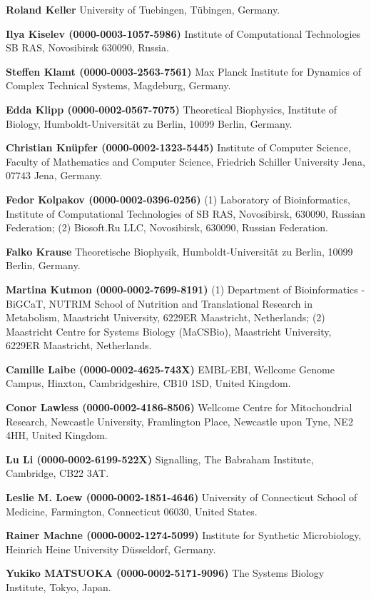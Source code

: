 \documentclass{sbml-paper}
\begin{document}
\textbf{Roland Keller} University of Tuebingen, Tübingen, Germany.

\textbf{Ilya Kiselev (0000-0003-1057-5986)} Institute of Computational Technologies SB RAS, Novosibirsk 630090, Russia.

\textbf{Steffen Klamt (0000-0003-2563-7561)} Max Planck Institute for Dynamics of Complex Technical Systems, Magdeburg, Germany.

\textbf{Edda Klipp (0000-0002-0567-7075)} Theoretical Biophysics, Institute of Biology, Humboldt-Universität zu Berlin, 10099 Berlin, Germany.

\textbf{Christian Knüpfer (0000-0002-1323-5445)} Institute of Computer Science, Faculty of Mathematics and Computer Science, Friedrich Schiller University Jena, 07743 Jena, Germany.

\textbf{Fedor Kolpakov (0000-0002-0396-0256)} (1) Laboratory of Bioinformatics, Institute of Computational Technologies of SB RAS, Novosibirsk, 630090, Russian Federation; (2) Biosoft.Ru LLC, Novosibirsk, 630090, Russian Federation.

\textbf{Falko Krause} Theoretische Biophysik, Humboldt-Universität zu Berlin, 10099 Berlin, Germany.

\textbf{Martina Kutmon (0000-0002-7699-8191)} (1) Department of Bioinformatics - BiGCaT, NUTRIM School of Nutrition and Translational Research in Metabolism, Maastricht University, 6229ER Maastricht, Netherlands; (2) Maastricht Centre for Systems Biology (MaCSBio), Maastricht University, 6229ER Maastricht, Netherlands.

\textbf{Camille Laibe (0000-0002-4625-743X)} EMBL-EBI, Wellcome Genome Campus, Hinxton, Cambridgeshire, CB10 1SD, United Kingdom.

\textbf{Conor Lawless (0000-0002-4186-8506)} Wellcome Centre for Mitochondrial Research, Newcastle University, Framlington Place, Newcastle upon Tyne, NE2 4HH, United Kingdom.

\textbf{Lu Li (0000-0002-6199-522X)} Signalling, The Babraham Institute, Cambridge, CB22 3AT.

\textbf{Leslie M. Loew (0000-0002-1851-4646)} University of Connecticut School of Medicine, Farmington, Connecticut 06030, United States.

\textbf{Rainer Machne (0000-0002-1274-5099)} Institute for Synthetic Microbiology, Heinrich Heine University Düsseldorf, Germany.

\textbf{Yukiko MATSUOKA (0000-0002-5171-9096)} The Systems Biology Institute, Tokyo, Japan.
\end{document}

